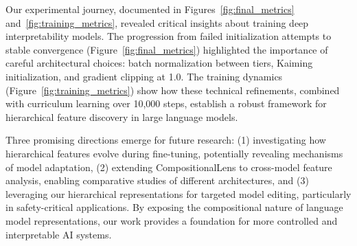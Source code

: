 \documentclass{article} %
\begin{document}
Our experimental journey, documented in Figures~\ref{fig:final_metrics} and~\ref{fig:training_metrics}, revealed critical insights about training deep interpretability models. The progression from failed initialization attempts to stable convergence (Figure~\ref{fig:final_metrics}) highlighted the importance of careful architectural choices: batch normalization between tiers, Kaiming initialization, and gradient clipping at 1.0. The training dynamics (Figure~\ref{fig:training_metrics}) show how these technical refinements, combined with curriculum learning over 10,000 steps, establish a robust framework for hierarchical feature discovery in large language models.

Three promising directions emerge for future research: (1) investigating how hierarchical features evolve during fine-tuning, potentially revealing mechanisms of model adaptation, (2) extending CompositionalLens to cross-model feature analysis, enabling comparative studies of different architectures, and (3) leveraging our hierarchical representations for targeted model editing, particularly in safety-critical applications. By exposing the compositional nature of language model representations, our work provides a foundation for more controlled and interpretable AI systems.



\end{document}
